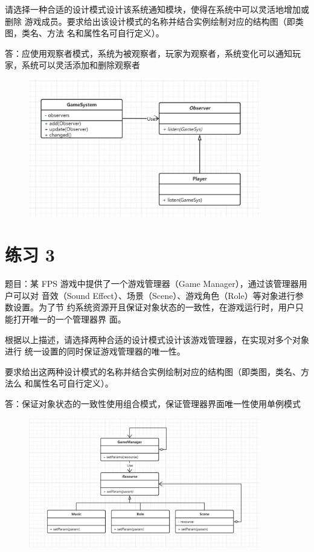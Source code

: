 \documentclass{article}
\begin{document}
请选择一种合适的设计模式设计该系统通知模块，使得在系统中可以灵活地增加或删除
游戏成员。要求给出该设计模式的名称并结合实例绘制对应的结构图（即类图，类名、方法
名和属性名可自行定义）。

\vspace{1em}

答：应使用观察者模式，系统为被观察者，玩家为观察者，系统变化可以通知玩家，系统可以灵活添加和删除观察者

\begin{figure}[H]
    \centering
    \includegraphics[width=0.9\textwidth]{UML2.png}
\end{figure} 


\section*{练习 3}

题目：某 FPS 游戏中提供了一个游戏管理器（Game Manager），通过该管理器用户可以对
音效（Sound Effect）、场景（Scene）、游戏角色（Role）等对象进行参数设置。为了节
约系统资源开且保证对象状态的一致性，在游戏运行时，用户只能打开唯一的一个管理器界
面。

根据以上描述，请选择两种合适的设计模式设计该游戏管理器，在实现对多个对象进行
统一设置的同时保证游戏管理器的唯一性。

要求给出这两种设计模式的名称并结合实例绘制对应的结构图（即类图，类名、方法么
和属性名可自行定义）。

\vspace{1em}

答：保证对象状态的一致性使用组合模式，保证管理器界面唯一性使用单例模式

\begin{figure}[H]
    \centering
    \includegraphics[width=0.9\textwidth]{UML3.png}
\end{figure} 
\end{document}

